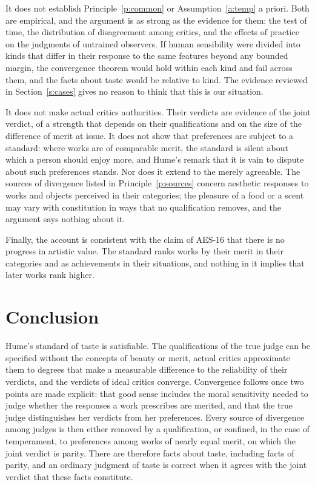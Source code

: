 \documentclass{situationist-preprint}
\begin{document}
It does not establish Principle~\ref{p:common} or Assumption~\ref{a:temp} a priori. Both are empirical, and the argument is as strong as the evidence for them: the test of time, the distribution of disagreement among critics, and the effects of practice on the judgments of untrained observers. If human sensibility were divided into kinds that differ in their response to the same features beyond any bounded margin, the convergence theorem would hold within each kind and fail across them, and the facts about taste would be relative to kind. The evidence reviewed in Section~\ref{s:cases} gives no reason to think that this is our situation.

It does not make actual critics authorities. Their verdicts are evidence of the joint verdict, of a strength that depends on their qualifications and on the size of the difference of merit at issue. It does not show that preferences are subject to a standard: where works are of comparable merit, the standard is silent about which a person should enjoy more, and Hume's remark that it is vain to dispute about such preferences stands. Nor does it extend to the merely agreeable. The sources of divergence listed in Principle~\ref{p:sources} concern aesthetic responses to works and objects perceived in their categories; the pleasure of a food or a scent may vary with constitution in ways that no qualification removes, and the argument says nothing about it.

Finally, the account is consistent with the claim of AES-16 that there is no progress in artistic value. The standard ranks works by their merit in their categories and as achievements in their situations, and nothing in it implies that later works rank higher.

\section{Conclusion}

Hume's standard of taste is satisfiable. The qualifications of the true judge can be specified without the concepts of beauty or merit, actual critics approximate them to degrees that make a measurable difference to the reliability of their verdicts, and the verdicts of ideal critics converge. Convergence follows once two points are made explicit: that good sense includes the moral sensitivity needed to judge whether the responses a work prescribes are merited, and that the true judge distinguishes her verdicts from her preferences. Every source of divergence among judges is then either removed by a qualification, or confined, in the case of temperament, to preferences among works of nearly equal merit, on which the joint verdict is parity. There are therefore facts about taste, including facts of parity, and an ordinary judgment of taste is correct when it agrees with the joint verdict that these facts constitute.
\end{document}
